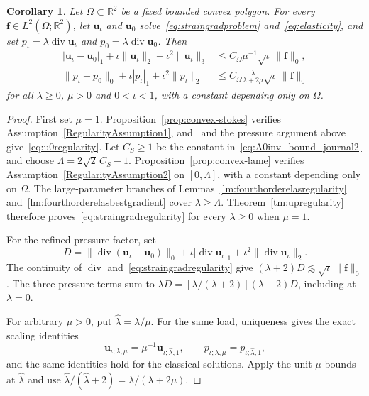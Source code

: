 \documentclass[10pt]{amsart}
\newtheorem{corollary}[theorem]{Corollary}
\renewcommand{\div}{\operatorname{div}}
\numberwithin{equation}{section}
\begin{document}
\begin{corollary}\label{cor:convex-regularity}
Let $\Omega\subset\mathbb R^2$ be a fixed bounded convex polygon. For every $\boldsymbol f\in L^2(\Omega;\mathbb R^2)$, let $\boldsymbol u_\iota$ and $\boldsymbol u_0$ solve~\eqref{eq:straingradproblem} and~\eqref{eq:elasticity}, and set $p_\iota=\lambda\div\boldsymbol u_\iota$ and $p_0=\lambda\div\boldsymbol u_0$. Then
\[
\begin{aligned}
|\boldsymbol u_\iota-\boldsymbol u_0|_1+\iota\|\boldsymbol u_\iota\|_2+\iota^2\|\boldsymbol u_\iota\|_3
&\leq C_\Omega\mu^{-1}\sqrt\iota\,\|\boldsymbol f\|_0,\\
\|p_\iota-p_0\|_0+\iota|p_\iota|_1+\iota^2\|p_\iota\|_2
&\leq C_\Omega\frac{\lambda}{\lambda+2\mu}\sqrt\iota\,\|\boldsymbol f\|_0
\end{aligned}
\]
for all $\lambda\geq0$, $\mu>0$ and $0<\iota<1$, with a constant depending only on $\Omega$.
\end{corollary}
\begin{proof}
First set $\mu=1$. Proposition~\ref{prop:convex-stokes} verifies Assumption~\ref{RegularityAssumption1}, and~\cite[Theorem~3.1]{BacutaBramble2003} and the pressure argument above give~\eqref{eq:u0regularity}. Let $C_S\geq1$ be the constant in~\eqref{eq:A0inv_bound_journal2} and choose $\Lambda=2\sqrt2\,C_S-1$. Proposition~\ref{prop:convex-lame} verifies Assumption~\ref{RegularityAssumption2} on $[0,\Lambda]$, with a constant depending only on $\Omega$. The large-parameter branches of Lemmas~\ref{lm:fourthorderelasregularity} and~\ref{lm:fourthorderelasbestgradient} cover $\lambda\geq\Lambda$. Theorem~\ref{tm:upregularity} therefore proves~\eqref{eq:straingradregularity} for every $\lambda\geq0$ when $\mu=1$.

For the refined pressure factor, set
\[
D=\|\div(\boldsymbol u_\iota-\boldsymbol u_0)\|_0
+\iota|\div\boldsymbol u_\iota|_1+\iota^2\|\div\boldsymbol u_\iota\|_2.
\]
The continuity of $\div$ and~\eqref{eq:straingradregularity} give $(\lambda+2)D\lesssim\sqrt\iota\,\|\boldsymbol f\|_0$. The three pressure terms sum to $\lambda D=[\lambda/(\lambda+2)](\lambda+2)D$, including at $\lambda=0$.

For arbitrary $\mu>0$, put $\widehat\lambda=\lambda/\mu$. For the same load, uniqueness gives the exact scaling identities
\[
\boldsymbol u_{\iota;\lambda,\mu}
=\mu^{-1}\boldsymbol u_{\iota;\widehat\lambda,1},
\qquad
p_{\iota;\lambda,\mu}=p_{\iota;\widehat\lambda,1},
\]
and the same identities hold for the classical solutions. Apply the unit-$\mu$ bounds at $\widehat\lambda$ and use
$\widehat\lambda/(\widehat\lambda+2)=\lambda/(\lambda+2\mu)$.
\end{proof}
\end{document}
